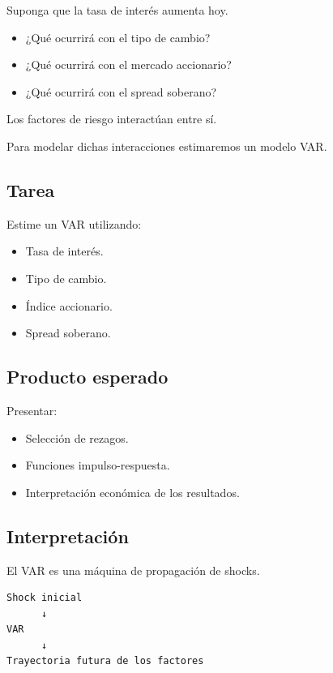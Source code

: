 \documentclass[11pt]{article}
\begin{document}
Suponga que la tasa de interés aumenta hoy.

\begin{itemize}
\item ¿Qué ocurrirá con el tipo de cambio?
\item ¿Qué ocurrirá con el mercado accionario?
\item ¿Qué ocurrirá con el spread soberano?
\end{itemize}

Los factores de riesgo interactúan entre sí.

Para modelar dichas interacciones estimaremos un modelo VAR.

\subsection*{Tarea}

Estime un VAR utilizando:

\begin{itemize}
\item Tasa de interés.
\item Tipo de cambio.
\item Índice accionario.
\item Spread soberano.
\end{itemize}

\subsection*{Producto esperado}

Presentar:

\begin{itemize}
\item Selección de rezagos.
\item Funciones impulso-respuesta.
\item Interpretación económica de los resultados.
\end{itemize}

\subsection*{Interpretación}

El VAR es una máquina de propagación de shocks.

\begin{center}
\begin{verbatim}
Shock inicial
      ↓
VAR
      ↓
Trayectoria futura de los factores
\end{verbatim}
\end{center}
\end{document}
